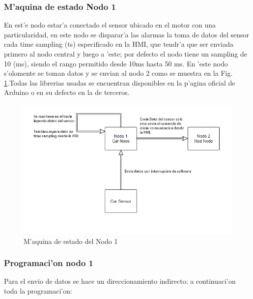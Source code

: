 \subsubsection{M'aquina de estado Nodo 1}
En est'e nodo estar'a conectado el sensor ubicado en el motor con una particularidad, en este nodo se disparar'a las alarmas la toma de datos del sensor cada time sampling (ts) especificado en la HMI, que tendr'a que ser enviada primero al nodo central y luego a 'este; por defecto el nodo tiene un sampling de 10 (ms), siendo el rango permitido desde 10ms hasta 50 ms. En 'este nodo s'olomente se toman datos y se envian al nodo 2 como se muestra en la Fig. \ref{fig:nodo1}.Todas las librerias usadas se encuentran disponibles en la p'agina oficial de Arduino o en su defecto en la de terceros.
\begin{figure}[ht]
	\centering
		\includegraphics[scale=0.6]{nodo1}
	\caption{M'aquina de estado del Nodo 1}
	\label{fig:nodo1}
\end{figure}
\subsubsection{Programaci'on nodo 1}

Para el envio de datos se hace un direccionamiento indirecto; a continuaci'on toda la programaci'on: 

